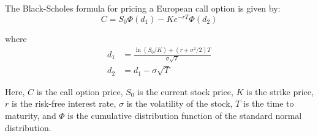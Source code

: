 
The Black-Scholes formula for pricing a European call option is given by:
\begin{equation}
C = S_0 \Phi(d_1) - K e^{-rT} \Phi(d_2)
\end{equation}

where
\begin{align}
d_1 &= \frac{\ln(S_0 / K) + (r + \sigma^2 / 2) T}{\sigma \sqrt{T}} \\
d_2 &= d_1 - \sigma \sqrt{T}
\end{align}

Here, \(C\) is the call option price, \(S_0\) is the current stock price, \(K\) is the strike price, \(r\) is the risk-free interest rate, \(\sigma\) is the volatility of the stock, \(T\) is the time to maturity, and \(\Phi\) is the cumulative distribution function of the standard normal distribution.
